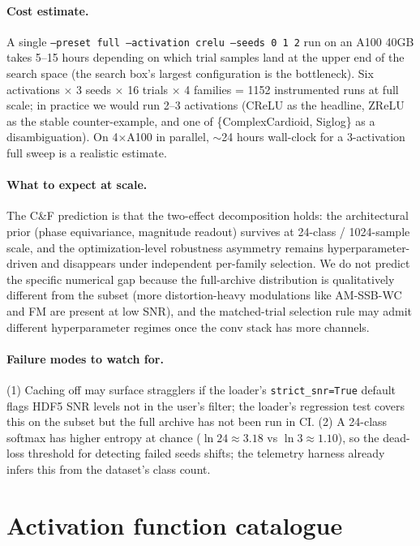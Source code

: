 \documentclass{article}
\newcommand{\code}[1]{\texttt{#1}}
\begin{document}
\paragraph{Cost estimate.} A single
\code{--preset full --activation crelu --seeds 0 1 2} run on an A100
40GB takes 5--15 hours depending on which trial samples land at the
upper end of the search space (the search box's largest configuration
is the bottleneck). Six activations $\times$ 3 seeds $\times$ 16
trials $\times$ 4 families = 1152 instrumented runs at full scale; in
practice we would run 2--3 activations (CReLU as the headline,
ZReLU as the stable counter-example, and one of
\{ComplexCardioid, Siglog\} as a disambiguation). On 4$\times$A100 in
parallel, $\sim$24 hours wall-clock for a 3-activation full sweep is a
realistic estimate.

\paragraph{What to expect at scale.} The C\&F prediction is that the
two-effect decomposition holds: the architectural prior (phase
equivariance, magnitude readout) survives at 24-class /
1024-sample scale, and the optimization-level robustness asymmetry
remains hyperparameter-driven and disappears under independent per-family
selection. We do not predict the specific numerical gap because the
full-archive distribution is qualitatively different from the subset
(more distortion-heavy modulations like AM-SSB-WC and FM are present
at low SNR), and the matched-trial selection rule may admit different
hyperparameter regimes once the conv stack has more channels.

\paragraph{Failure modes to watch for.} (1) Caching off may surface
stragglers if the loader's \code{strict\_snr=True} default flags
HDF5 SNR levels not in the user's filter; the loader's regression
test covers this on the subset but the full archive has not been run
in CI. (2) A 24-class softmax has higher entropy at chance ($\ln 24
\approx 3.18$ vs $\ln 3 \approx 1.10$), so the dead-loss threshold for
detecting failed seeds shifts; the telemetry harness already infers
this from the dataset's class count.

\section{Activation function catalogue}
\label{app:activations}
\end{document}
